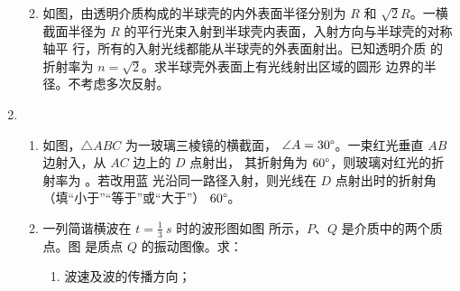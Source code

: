 \begin{enumerate}
\begin{enumerate}

\item 
如图，由透明介质构成的半球壳的内外表面半径分别为 $ R $ 和 $ \sqrt{2}R $。一横截面半径为 $ R $
的平行光束入射到半球壳内表面，入射方向与半球壳的对称轴平
行，所有的入射光线都能从半球壳的外表面射出。已知透明介质
的折射率为 $ n=\sqrt{2} $。求半球壳外表面上有光线射出区域的圆形
边界的半径。不考虑多次反射。
\begin{figure}[h!]
	\flushright
	
\end{figure}





\end{enumerate}



\item 
{}
\begin{enumerate}
	\item
如图，$ \triangle ABC $ 为一玻璃三棱镜的横截面，
$ \angle A=30 \degree $。一束红光垂直 $ AB $ 边射入，从 $ AC $ 边上的 $ D $ 点射出，
其折射角为 $ 60 \degree $，则玻璃对红光的折射率为 \underlinegap 。若改用蓝
光沿同一路径入射，则光线在 $ D $ 点射出时的折射角  \underlinegap 
（填“小于”“等于”或“大于”） $ 60 \degree $。
\begin{figure}[h!]
	\centering
	
\end{figure}




\item 
一列简谐横波在 $ t= \frac{ 1 }{ 3 } \ s $ 时的波形图如图   所示，$ P $、$ Q $ 是介质中的两个质点。图  是质点 $ Q $ 的振动图像。求：
\begin{enumerate}
	\item
波速及波的传播方向；


\end{enumerate}
\end{enumerate}
\end{enumerate}
